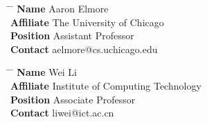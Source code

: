 \documentclass[10pt]{article} %
\begin{document}
\parbox{0.5\textwidth}{ %
\begin{tabbing}
\hspace{1.5cm} \= \hspace{4cm} \= \kill %
{\bf Name} \> Aaron Elmore \\ %
{\bf Affiliate} \> The University of Chicago \\ %
{\bf Position} \> Assistant Professor \\ %
{\bf Contact} \> aelmore@cs.uchicago.edu %
\end{tabbing}}
\hfill %
\parbox{0.5\textwidth}{ %
\begin{tabbing}
\hspace{1.5cm} \= \hspace{4cm} \= \kill %
{\bf Name} \> Wei Li\\ %
{\bf Affiliate} \> Institute of Computing Technology \\ %
{\bf Position} \> Associate Professor \\ %
{\bf Contact} \> liwei@ict.ac.cn %
\end{tabbing}} 


\end{document}

